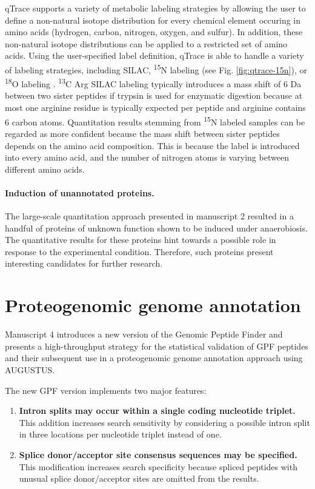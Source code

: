 qTrace supports a variety of metabolic labeling strategies by allowing the 
user to define a non-natural isotope distribution for every chemical element 
occuring in amino acids (hydrogen, carbon, nitrogen, oxygen, and sulfur).
In addition, these non-natural isotope distributions can be applied 
to a restricted set of amino acids.
Using the user-specified label definition, qTrace is able to handle a variety
of labeling strategies, including SILAC, \textsuperscript{15}N labeling (see 
Fig. \ref{fig:qtrace-15n}), or \textsuperscript{18}O labeling 
\citep{Miyagi2007}.
\textsuperscript{13}C Arg SILAC labeling typically introduces a mass shift
of 6 Da between two sister peptides if trypsin is used for enzymatic digestion
because at most one arginine residue is typically expected per peptide and
arginine contains 6 carbon atoms.
Quantitation results stemming from \textsuperscript{15}N labeled samples
can be regarded as more confident because the mass shift between sister peptides
depends on the amino acid composition.
This is because the label is introduced into every amino acid, and the number of
nitrogen atoms is varying between different amino acids.

\paragraph{Induction of unannotated proteins.}

The large-scale quantitation approach presented in manuscript 2 resulted
in a handful of proteins of unknown function shown to be induced under
anaerobiosis.
The quantitative results for these proteins hint towards a possible role
in response to the experimental condition.
Therefore, such proteins present interesting candidates for further research.

\section{Proteogenomic genome annotation}

Manuscript 4 introduces a new version of the Genomic Peptide Finder and
presents a high-throughput strategy for the statistical validation of
GPF peptides and their subsequent use in a proteogenomic genome annotation
approach using AUGUSTUS.

The new GPF version implements two major features:

\begin{enumerate}
\item {\bf Intron splits may occur within a single coding nucleotide triplet.}
This addition increases search sensitivity by considering a possible intron
split in three locations per nucleotide triplet instead of one.

\item {\bf Splice donor/acceptor site consensus sequences may be specified.} 
This modification increases search specificity because spliced peptides with
unusual splice donor/acceptor sites are omitted from the results.
\end{enumerate}

